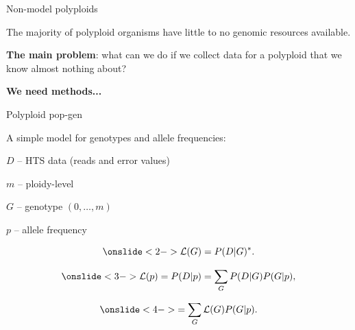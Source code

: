 \documentclass[presentation,sansserif,12pt]{beamer}
\begin{document}
\begin{frame}[t]{Non-model polyploids}
  \vspace{0.1in}

  The majority of polyploid organisms have little to no genomic resources available.
  \vspace{0.3in}
  \pause
  
  \textbf{The main problem}: what can we do if we collect data for a polyploid that we know almost nothing about?
  
  

  \vspace{0.3in}
  \pause
  
  \textbf{We need methods...}

\end{frame}

\begin{frame}[t]{Polyploid pop-gen}

  \vspace{0.1in}
  A simple model for genotypes and allele frequencies:
  \vspace{0.2in}
  
	$D$ -- HTS data (reads and error values)
	
	$m$ -- ploidy-level
	
	$G$ -- genotype $(0,\dots,m)$
	
	$p$ -- allele frequency
		
	\pause
	\begin{equation*}
		\onslide<2->{\mathcal{L}(G) = P(D|G)^*.}
	\end{equation*}
	\vspace{-0.2in}
	
	\begin{equation*}
		\onslide<3->{\mathcal{L}(p) = P(D|p) = \sum_G P(D|G)P(G|p),}
	\end{equation*}
	\vspace{-0.2in}
	
	\begin{equation*}
		\onslide<4->{= \sum_G \mathcal{L}(G)P(G|p).}
	\end{equation*}
	

\end{frame}
\end{document}
